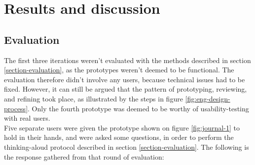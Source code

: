 \section{Results and discussion}



\subsection{Evaluation}

The first three iterations weren't evaluated with the methods described in section \ref{section-evaluation}, as the prototypes weren't deemed to be functional. The evaluation therefore didn't involve any users, because technical issues had to be fixed. However, it can still be argued that the pattern of prototyping, reviewing, and refining took place, as illustrated by the steps in figure \ref{fig:eng-design-process}. Only the fourth prototype was deemed to be worthy of usability-testing with real users. \\

Five separate users were given the prototype shown on figure \ref{fig:journal-1} to hold in their hands, and were asked some questions, in order to perform the thinking-aloud protocol described in section \ref{section-evaluation}. The following is the response gathered from that round of evaluation:

